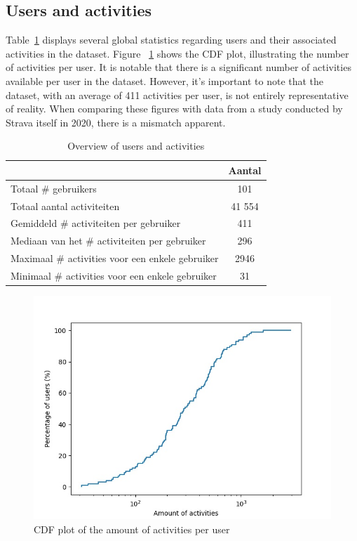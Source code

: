 \documentclass[conference]{IEEEtran}
\begin{document}
\subsection{Users and activities}
Table~\ref{tab:stats_dataset} displays several global statistics regarding
users and their associated activities in the dataset. Figure
~\ref{fig:cdf_amount_activities} shows the CDF plot, illustrating the number of
activities per user. It is notable that there is a significant number of
activities available per user in the dataset. However, it's important to note
that the dataset, with an average of 411 activities per user, is not entirely
representative of reality. When comparing these figures with data from a study
conducted by Strava itself in 2020, there is a mismatch apparent.
\begin{table}[h]
    \centering
    \begin{tabular}{|l||c|}
        \hline
                                                         & \textbf{Aantal} \\
        \hline \hline
        Totaal \# gebruikers                             & 101             \\
        \hline
        Totaal aantal activiteiten                       & 41 554          \\
        \hline
        Gemiddeld \# activiteiten per gebruiker          & 411             \\
        \hline
        Mediaan van het \# activiteiten per gebruiker    & 296             \\
        \hline
        Maximaal \# activities voor een enkele gebruiker & 2946            \\
        \hline
        Minimaal \# activities voor een enkele gebruiker & 31              \\
        \hline
    \end{tabular}
    \captionsetup{justification=centering}
    \caption{Overview of users and activities}\label{tab:stats_dataset}
\end{table}
\begin{figure}[h]
    \centering
    \includegraphics[width=0.8\linewidth]{fig/Afwijkingen&Analyses/CDF_amountActivities.jpg}
    \caption{CDF plot of the amount of activities per user}\label{fig:cdf_amount_activities}
\end{figure}
\end{document}
